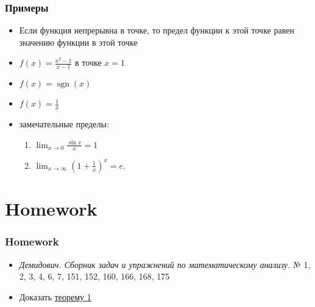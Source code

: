 \documentclass[10pt]{beamer}
\numberwithin{equation}{subsection}
\begin{document}
    \begin{frame}
        \frametitle{Примеры}
        \begin{itemize}
            \item Если функция непрерывна в точке, то предел функции к этой точке равен значению функции в этой точке
            \item $\displaystyle f(x) = \frac{x^2 - 1}{x-1}$ в точке $x=1$
            \item $f(x) = \operatorname{sgn}(x)$
            \item $\displaystyle f(x) = \frac{1}{x}$
            \item замечательные пределы:
            \begin{enumerate}
                \item $\displaystyle\lim_{x \rightarrow 0} \frac{\sin x}{x} = 1$
                \item $\displaystyle\lim _{{x\to \infty }}\left(1+{\frac  {1}{x}}\right)^{x}=e$.
            \end{enumerate}
        \end{itemize}
    \end{frame}

    \section{Homework}
    \begin{frame}
        \frametitle{Homework}
        \begin{itemize}
            \item \textit{Демидович. Сборник задач и упражнений по математическому анализу.} № 1, 2, 3, 4, 6, 7, 151, 152, 160, 166, 168, 175
            \item Доказать \hyperlink{th:th1}{теорему 1}
        \end{itemize}
    \end{frame}
\end{document}

